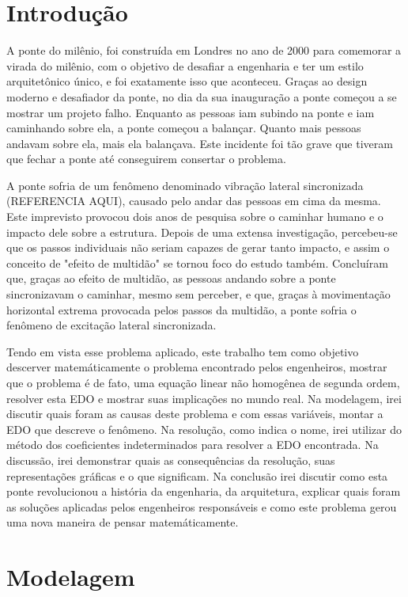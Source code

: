 \documentclass[]{article}
\begin{document}
\section{Introdução}

A ponte do milênio, foi construída em Londres no ano de 2000 para comemorar
a virada do milênio, com o objetivo de desafiar a engenharia e ter um estilo arquitetônico único, e foi exatamente isso que aconteceu.
Graças ao design moderno e desafiador da ponte, no dia da sua inauguração a ponte começou a se mostrar um projeto falho.
Enquanto as pessoas iam subindo na ponte e iam caminhando sobre ela, a ponte começou a balançar. Quanto mais pessoas andavam sobre ela,
mais ela balançava. Este incidente foi tão grave que tiveram que fechar a ponte até conseguirem consertar o problema.

A ponte sofria de um fenômeno denominado vibração lateral sincronizada (REFERENCIA AQUI), causado pelo andar das pessoas em cima da mesma.
Este imprevisto provocou dois anos de pesquisa sobre o caminhar humano e o impacto dele sobre a estrutura. 
Depois de uma extensa investigação, percebeu-se que os passos individuais não seriam capazes de gerar tanto impacto, e assim
o conceito de "efeito de multidão" se tornou foco do estudo também. Concluíram que, graças ao efeito de multidão,
as pessoas andando sobre a ponte sincronizavam o caminhar, mesmo sem perceber, e que, graças à movimentação horizontal extrema provocada pelos
passos da multidão, a ponte sofria o fenômeno de excitação lateral sincronizada.

Tendo em vista esse problema aplicado, este trabalho tem como objetivo descerver matemáticamente
o problema encontrado pelos engenheiros, mostrar que o problema é de fato, uma equação linear não 
homogênea de segunda ordem, resolver esta EDO e mostrar suas implicações no mundo real.
Na modelagem, irei discutir quais foram as causas deste problema e com essas variáveis, montar a EDO que
descreve o fenômeno. Na resolução, como indica o nome, irei utilizar do método dos coeficientes indeterminados
para resolver a EDO encontrada. Na discussão, irei demonstrar quais as consequências da resolução, suas representações
gráficas e o que significam.
Na conclusão irei discutir como esta ponte revolucionou a história da engenharia, da arquitetura, explicar quais foram as soluções 
aplicadas pelos engenheiros responsáveis e como este problema gerou uma nova maneira de pensar matemáticamente.

\pagebreak 
\section{Modelagem}
\end{document}
